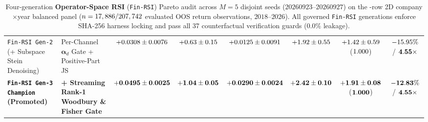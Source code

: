 \begin{table}[t]
{\begin{tabular}{llcccccc}
\texttt{Fin-RSI Gen-2} (+ Subspace Stein Denoising) & Per-Channel $\boldsymbol{\alpha}_d$ Gate + Positive-Part JS & $+0.0308{} \pm 0.0076{}$ & $+0.63{} \pm 0.15{}$ & $+0.0125{} \pm 0.0091{}$ & $+1.92{} \pm 0.55{}$ & $+1.42{} \pm 0.59{}$ ($1.000{}$) & $-15.95{}\%$ / $\mathbf{4.55{}\times}$ \\
\textbf{\texttt{Fin-RSI Gen-3 Champion} (Promoted)} & \textbf{+ Streaming Rank-1 Woodbury \& Fisher Gate} & $\mathbf{+0.0495{} \pm 0.0025{}}$ & $\mathbf{+1.04{} \pm 0.05{}}$ & $\mathbf{+0.0290{} \pm 0.0024{}}$ & $\mathbf{+2.42{} \pm 0.10{}}$ & $\mathbf{+1.91{} \pm 0.08{}}$ ($\mathbf{1.000{}}$) & $\mathbf{-12.83{}\%}$ / $\mathbf{4.55{}\times}$ \\
\bottomrule
\end{tabular}%
}
\caption{Four-generation \textbf{Operator-Space RSI} (\texttt{Fin-RSI}) Pareto audit across $M=5$ disjoint seeds ($20260923\text{--}20260927$) on the \PanelBalancedRows{}-row 2D company$\times$year balanced panel ($n = 17,886{} / 207,742{}$ evaluated OOS return observations, $2018\text{--}2026$). All governed \texttt{Fin-RSI} generations enforce SHA-256 harness locking and pass all 37 counterfactual verification guards ($0.0\%$ leakage).}
\label{tab:fin_rsi_pareto_ledger}
\end{table}


